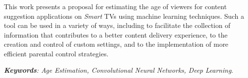 
  This work presents a proposal for estimating the age of viewers for content suggestion applications on \emph {Smart} TVs using machine learning techniques. Such a tool can be used in a variety of ways, including to facilitate the collection of information that contributes to a better content delivery experience, to the creation and control of custom settings, and to the implementation of more efficient parental control strategies.

  \noindent \emph{\textbf{Keywords}: Age Estimation, Convolutional Neural Networks, Deep Learning}.

